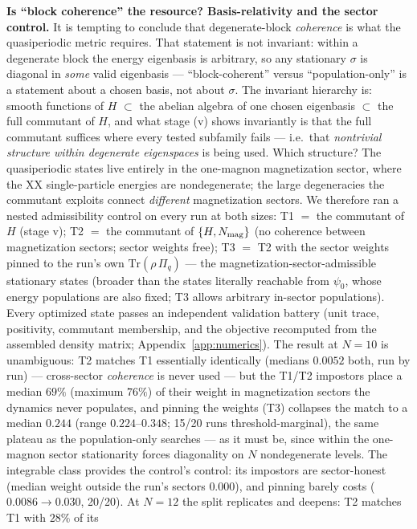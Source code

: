 \documentclass[a4paper,11pt,noarxiv]{quantumarticle}
\begin{document}
\textbf{Is ``block coherence'' the resource? Basis-relativity and the
sector control.} It is tempting to conclude that degenerate-block
\emph{coherence} is what the quasiperiodic metric requires. That
statement is not invariant: within a degenerate block the energy
eigenbasis is arbitrary, so any stationary $\sigma$ is diagonal in
\emph{some} valid eigenbasis --- ``block-coherent'' versus
``population-only'' is a statement about a chosen basis, not about
$\sigma$. The invariant hierarchy is: smooth functions of $H$
$\subset$ the abelian algebra of one chosen eigenbasis $\subset$ the
full commutant of $H$, and what stage (v) shows invariantly is that
the full commutant suffices where every tested subfamily fails ---
i.e.\ that \emph{nontrivial structure within degenerate eigenspaces}
is being used. Which structure? The quasiperiodic states live
entirely in the one-magnon magnetization sector, where the XX
single-particle energies are nondegenerate; the large degeneracies the
commutant exploits connect \emph{different} magnetization sectors. We
therefore ran a nested admissibility control on every run at both
sizes: T1 $=$ the commutant of $H$ (stage v); T2 $=$ the commutant of
$\{H, N_{\rm mag}\}$ (no coherence between magnetization sectors;
sector weights free); T3 $=$ T2 with the sector weights pinned to the
run's own $\mathrm{Tr}(\rho\,\Pi_q)$ --- the
magnetization-sector-admissible stationary states (broader than the
states literally reachable from $\psi_0$, whose energy populations
are also fixed; T3 allows arbitrary in-sector populations). Every
optimized state passes an independent validation battery (unit trace,
positivity, commutant membership, and the objective recomputed from
the assembled density matrix; Appendix~\ref{app:numerics}). The
result at $N{=}10$ is unambiguous: T2 matches T1 essentially
identically (medians $0.0052$ both, run by run) --- cross-sector
\emph{coherence} is never used --- but the T1/T2 impostors place a
median $69\%$ (maximum $76\%$) of their weight in magnetization
sectors the dynamics never populates, and pinning the weights (T3)
collapses the match to a median $0.244$ (range $0.224$--$0.348$;
15/20 runs threshold-marginal), the same plateau as the population-only
searches --- as it must be, since within the one-magnon sector
stationarity forces diagonality on $N$ nondegenerate levels. The
integrable class provides the control's control: its impostors are
sector-honest (median weight outside the run's sectors $0.000$), and
pinning barely costs ($0.0086 \to 0.030$, 20/20). At $N{=}12$ the
split replicates and deepens: T2 matches T1 with $28\%$ of its
\end{document}
